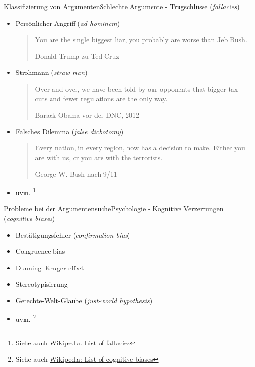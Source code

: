 \documentclass{beamer}
\begin{document}
		\begin{frame}{Klassifizierung von Argumenten}{Schlechte Argumente - Trugschlüsse (\textit{fallacies})}
		\begin{itemize}[<+->]
			\item Persönlicher Angriff (\textit{ad hominem})
			\begin{quote}
				\small You are the single biggest liar, you probably are worse than Jeb Bush.
				\begin{flushright}
					\tiny Donald Trump zu Ted Cruz
				\end{flushright}
			\end{quote}
			\item Strohmann (\textit{straw man})
			\begin{quote}{}
				\small Over and over, we have been told by our opponents that bigger tax cuts and fewer regulations are the only way.
				\begin{flushright}
					\tiny Barack Obama vor der DNC, 2012
				\end{flushright}
			\end{quote}
			\item Falsches Dilemma (\textit{false dichotomy})
			\begin{quote}{}
				\small Every nation, in every region, now has a decision to make. Either you are with us, or you are with the terrorists.
				\begin{flushright}
					\tiny George W. Bush nach 9/11
				\end{flushright}
			\end{quote}
			\item uvm. \footnote{Siehe auch \href{https://en.wikipedia.org/wiki/List_of_fallacies}{Wikipedia: List of fallacies}}
		\end{itemize}
	\end{frame}

	\begin{frame}{Probleme bei der Argumentensuche}{Psychologie - Kognitive Verzerrungen (\textit{cognitive biases})}
		\begin{itemize}
			\item Bestätigungsfehler (\textit{confirmation bias})
			\item Congruence bias
			\item Dunning–Kruger effect
			\item Stereotypisierung
			\item Gerechte-Welt-Glaube (\textit{just-world hypothesis})
			\item uvm. \footnote{Siehe auch \href{https://en.wikipedia.org/wiki/List_of_cognitive_biases}{Wikipedia: List of cognitive biases}}
		\end{itemize}
	\end{frame}
\end{document}
